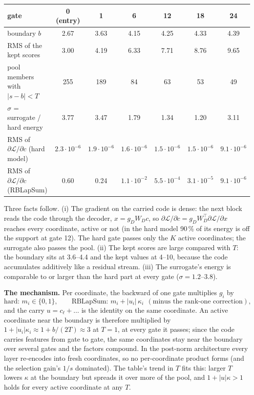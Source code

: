 \documentclass[11pt,a4paper]{article}
\begin{document}
\begin{center}\small
\begin{tabular}{lcccccc}
\toprule
gate & 0 (entry) & 1 & 6 & 12 & 18 & 24 \\
\midrule
boundary \(b\)                        & 2.67 & 3.63 & 4.15 & 4.25 & 4.33 & 4.39 \\
RMS of the kept scores                & 3.00 & 4.19 & 6.33 & 7.71 & 8.76 & 9.65 \\
pool members with \(|s-b|<T\)          & 255 & 189 & 84 & 63 & 53 & 49 \\
\(\sigma\) = surrogate / hard energy   & 3.77 & 3.47 & 1.79 & 1.34 & 1.20 & 3.11 \\
RMS of \(\partial\mathcal L/\partial c\) (hard model) & \(2.3\cdot10^{-6}\) & \(1.9\cdot10^{-6}\) & \(1.6\cdot10^{-6}\) & \(1.5\cdot10^{-6}\) & \(1.5\cdot10^{-6}\) & \(9.1\cdot10^{-6}\) \\
RMS of \(\partial\mathcal L/\partial c\) (RBLapSum) & 0.60 & 0.24 & \(1.1\cdot10^{-2}\) & \(5.5\cdot10^{-4}\) & \(3.1\cdot10^{-5}\) & \(9.1\cdot10^{-6}\) \\
\bottomrule
\end{tabular}
\end{center}

Three facts follow.  (i) The gradient on the carried code is dense: the next block reads the code through the
decoder, \(x=g_DW_Dc\), so \(\partial\mathcal L/\partial c=g_DW_D^\top\partial\mathcal L/\partial x\) reaches every
coordinate, active or not (in the hard model 90\,\% of its energy is off the support at gate 12).  The hard gate
passes only the \(K\) active coordinates; the surrogate also passes the pool.  (ii) The kept scores are large
compared with \(T\): the boundary sits at 3.6--4.4 and the kept values at 4--10, because the code accumulates
additively like a residual stream.  (iii) The surrogate's energy is comparable to or larger than the hard part at
every gate (\(\sigma=1.2\)--3.8).

\textbf{The mechanism.}  Per coordinate, the backward of one gate multiplies \(g_i\) by
\begin{equation}
  \text{hard: }m_i\in\{0,1\},\qquad
  \text{RBLapSum: }m_i+|u_i|\,\kappa_i\ \ (\text{minus the rank-one correction}),
\end{equation}
and the carry \(u=c_\ell+\dots\) is the identity on the same coordinate.  An active coordinate near the boundary
is therefore multiplied by \(1+|u_i|\kappa_i\approx1+b/(2T)\approx3\) at \(T=1\), at every gate it passes; since
the code carries features from gate to gate, the same coordinates stay near the boundary over several gates and
the factors compound.  In the post-norm architecture every layer re-encodes into fresh coordinates, so no
per-coordinate product forms (and the selection gain's \(1/s\) dominated).  The table's trend in \(T\) fits this:
larger \(T\) lowers \(\kappa\) at the boundary but spreads it over more of the pool, and \(1+|u|\kappa>1\) holds for
every active coordinate at any \(T\).
\end{document}
